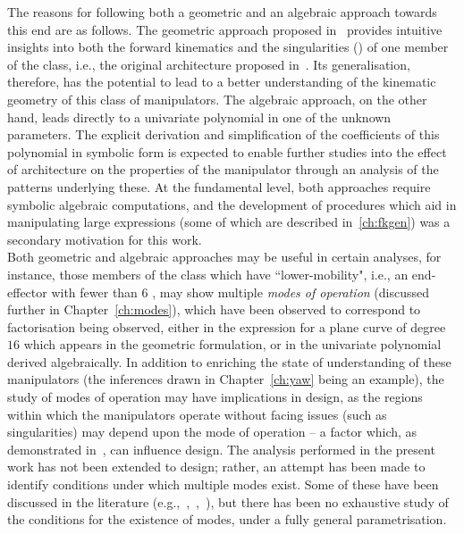 \documentclass[DD]{iitmdiss}
\newcommand{\mref}[1]{\ref{#1}}
\newcommand{\mcite}[1]{\cite{#1}}
\begin{document}
The reasons for following both a geometric and an algebraic approach towards this end are as follows. The geometric approach proposed in~\mcite{tk2017a} provides intuitive insights into both the forward kinematics and the singularities (\mcite{tk2017b}) of one member of the class, i.e., the original architecture proposed in~\mcite{hunt1978}. Its generalisation, therefore, has the potential to lead to a better understanding of the kinematic geometry of this class of manipulators. The algebraic approach, on the other hand, leads directly to a univariate polynomial in one of the unknown parameters. The explicit derivation and simplification of the coefficients of this polynomial in symbolic form is expected to enable further studies into the effect of architecture on the properties of the manipulator through an analysis of the patterns underlying these. At the fundamental level, both approaches require symbolic algebraic computations, and the development of procedures which aid in manipulating large expressions (some of which are described in~\mref{ch:fkgen}) was a secondary motivation for this work. \\
Both geometric and algebraic approaches may be useful in certain analyses, for instance, those members of the class which have ``lower-mobility", i.e., an end-effector with fewer than $6$ \dofs, may show multiple \emph{modes of operation} (discussed further in Chapter~\mref{ch:modes}), which have been observed to correspond to factorisation being observed, either in the expression for a plane curve of degree~$16$ which appears in the geometric formulation, or in the univariate polynomial derived algebraically. In addition to enriching the state of understanding of these manipulators (the inferences drawn in Chapter~\mref{ch:yaw} being an example), the study of modes of operation may have implications in design, as the regions within which the manipulators operate without facing issues (such as singularities) may depend upon the mode of operation -- a factor which, as demonstrated in~\mcite{nayak2018b}, can influence design. The analysis performed in the present work has not been extended to design; rather, an attempt has been made to identify conditions under which multiple modes exist. Some of these have been discussed in the literature (e.g.,~\mcite{nayak2018a},~\mcite{nayak2018b},~\mcite{pavanddp}), but there has been no exhaustive study of the conditions for the existence of modes, under a fully general parametrisation.\\
\end{document}
